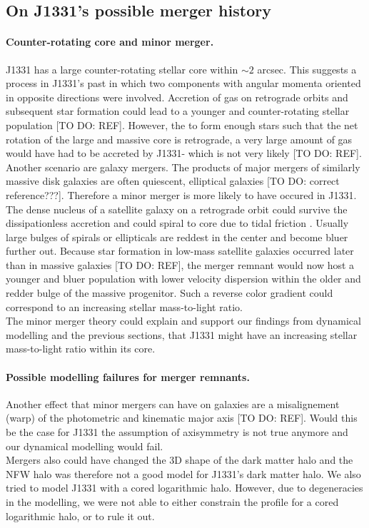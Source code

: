 \subsection{On J1331's possible merger history}

\paragraph{Counter-rotating core and minor merger.} J1331 has a large counter-rotating stellar core within $\sim 2$ arcsec. This suggests a process in J1331's past in which two components with angular momenta oriented in opposite directions were involved. Accretion of gas on retrograde orbits and subsequent star formation could lead to a younger and counter-rotating stellar population [TO DO: REF]. However, the to form enough stars such that the net rotation of the large and massive core is retrograde, a very large amount of gas would have had to be accreted by J1331- which is not very likely [TO DO: REF]. Another scenario are galaxy mergers. The products of major mergers of similarly massive disk galaxies are often quiescent, elliptical galaxies \citep{1972ApJ...178..623T} [TO DO: correct reference???]. Therefore a minor merger is more likely to have occured in J1331. The dense nucleus of a satellite galaxy on a retrograde orbit could survive the dissipationless accretion and could spiral to core due to tidal friction \citep{1984ApJ...287..577K}. Usually large bulges of spirals or ellipticals are reddest in the center and become bluer further out.  Because star formation in low-mass satellite galaxies occurred later than in massive galaxies [TO DO: REF], the merger remnant would now host a younger and bluer population with lower velocity dispersion within the older and redder bulge of the massive progenitor. Such a reverse color gradient could correspond to an increasing stellar mass-to-light ratio.
\\The minor merger theory could explain and support our findings from dynamical modelling and the previous sections, that J1331 might have an increasing stellar mass-to-light ratio within its core. 

\paragraph{Possible modelling failures for merger remnants.} Another effect that minor mergers can have on galaxies are a misalignement (warp) of the photometric and kinematic major axis [TO DO: REF]. Would this be the case for J1331 the assumption of axisymmetry is not true anymore and our dynamical modelling would fail.
\\Mergers also could have changed the 3D shape of the dark matter halo and the NFW halo was therefore not a good model for J1331's dark matter halo. We also tried to model J1331 with a cored logarithmic halo. However, due to degeneracies in the modelling, we were not able to either constrain the profile for a cored logarithmic halo, or to rule it out. 



